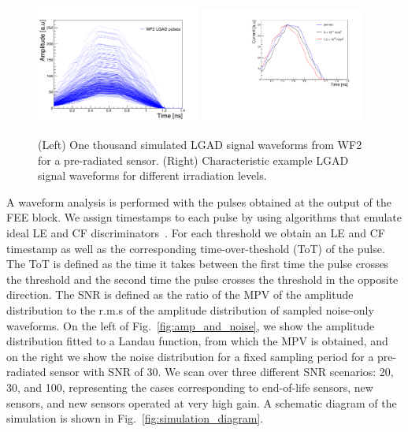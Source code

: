 \documentclass[preprint,1p]{elsarticle}
\begin{document}
 \begin{figure}[htbp]
   \centering
   \includegraphics[width=0.48\textwidth]{figs/lgad_current_pre_rad_all_pulses_v3.pdf} \hfill
   \includegraphics[width=0.48\textwidth]{figs/LGAD_current_all_irradiations_v2.pdf}
   \caption{(Left) One thousand simulated LGAD signal waveforms from WF2 for a pre-radiated sensor.
   (Right) Characteristic example LGAD signal waveforms for different irradiation levels.}
   \label{fig:lgad_current}
 \end{figure}


A waveform analysis is performed with the pulses obtained at the output of the
FEE block. We assign timestamps to each pulse by using algorithms that emulate
ideal LE and CF discriminators~\cite{Spieler}. For each threshold we obtain an LE and CF
timestamp as well as the corresponding time-over-theshold (ToT) of the pulse.
The ToT is defined as the time it takes between the first time the pulse crosses
the threshold and the second time the pulse crosses the threshold in the opposite direction. 
The SNR is defined as the ratio of the MPV of the amplitude distribution to the
r.m.s of the amplitude distribution of sampled noise-only waveforms.
On the left of Fig.~\ref{fig:amp_and_noise}, we show the amplitude distribution fitted to a Landau function, from
which the MPV is obtained, and on the right we show the noise distribution for a fixed sampling period for a 
pre-radiated sensor with SNR of 30. We scan over three different SNR scenarios: 20, 30, and 100, 
representing the cases corresponding to end-of-life sensors, new sensors, and new sensors
operated at very high gain. A schematic diagram of the
simulation is shown in Fig.~\ref{fig:simulation_diagram}.
\end{document}
